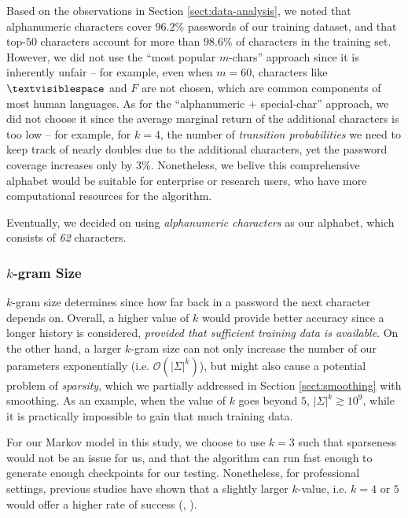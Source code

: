\documentclass{article} %
\theoremstyle{definition}
\theoremstyle{theorem}
\theoremstyle{remark}
\theoremstyle{remark}
\begin{document}
\par\quad Based on the observations in Section \ref{sect:data-analysis}, we noted that alphanumeric characters cover $96.2\%$ passwords of our training dataset, and that top-$50$ characters account for more than $98.6\%$ of characters in the training set. However, we did not use the ``most popular $m$-chars'' approach since it is inherently unfair -- for example, even when $m=60$, characters like $\textvisiblespace$ and $F$ are not chosen, which are common components of most human languages. As for the ``alphanumeric + special-char'' approach, we did not choose it since the average marginal return of the additional characters is too low -- for example, for $k=4$, the number of \emph{transition probabilities} we need to keep track of nearly doubles due to the additional characters, yet the password coverage increases only by $3\%$. Nonetheless, we belive this comprehensive alphabet would be suitable for enterprise or research users, who have more computational resources for the algorithm.

\par\quad Eventually, we decided on using \emph{alphanumeric characters} as our alphabet, which consists of \emph{62} characters.

\subsubsection{$k$-gram Size}
\par\quad $k$-gram size determines since how far back in a password the next character depends on. Overall, a higher value of $k$ would provide better accuracy since a longer history is considered, \emph{provided that sufficient training data is available}. On the other hand, a larger $k$-gram size can not only increase the number of our parameters exponentially (i.e. $\mathcal{O}(|\Sigma|^k)$), but might also cause a potential problem of \emph{sparsity}, which we partially addressed in Section \ref{sect:smoothing} with smoothing. As an example, when the value of $k$ goes beyond $5$, $|\Sigma|^k \gtrsim 10^9$, while it is practically impossible to gain that much training data.

\par\quad For our Markov model in this study, we choose to use $k=3$ such that sparseness would not be an issue for us, and that the algorithm can run fast enough to generate enough checkpoints for our testing. Nonetheless, for professional settings, previous studies have shown that a slightly larger $k$-value, i.e. $k=4$ or $5$ would offer a higher rate of success (\cite{omen}, \cite{probabilistic}).
\end{document}
